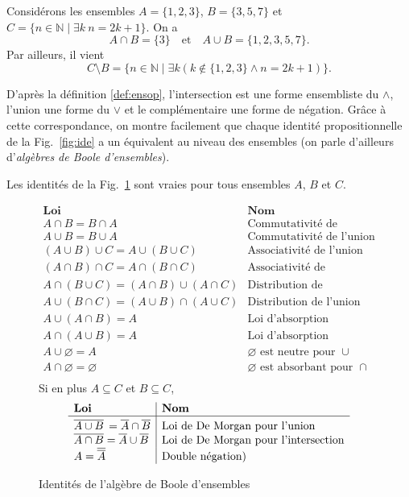 \documentclass[french,course,oneside,theoremnosection]{lecture}
\newcommand{\N}{\mathbb{N}}
\begin{document}
\begin{example}
Considérons les ensembles $A=\{1,2,3\}$, $B=\{3,5,7\}$ et $C=\{n \in \N \mid \exists k \ n=2k+1\}$.
On a 
\[
A\cap B=\{3\} \quad \text{et} \quad A \cup B=\{1,2,3,5,7\}.
\]
Par ailleurs, il vient
\[
C\setminus B = \{n \in \N \mid \exists k (k\not\in\{1, 2, 3\} \wedge n=2k+1)\}.
\]
\end{example}
D'après la définition \ref{def:ensop}, l'intersection est une forme ensembliste du $\wedge$, l'union une forme du $\vee$ et le complémentaire une forme de négation. Grâce à cette correspondance, on montre facilement que chaque identité propositionnelle de la Fig.~\ref{fig:ide} a un équivalent au niveau des ensembles (on parle d'ailleurs d'\emph{algèbres de Boole d'ensembles}).
\begin{proposition}
Les identités de la Fig.~\ref{fig:ens} sont vraies pour tous ensembles $A$, $B$ et $C$.
\end{proposition}
\begin{figure}
\[
\begin{array}{l|l}
\textbf{Loi} & \textbf{Nom} \\
\hline
A \cap B = B \cap A & \text{Commutativité de l'intersection} \\
A \cup B = B \cup A & \text{Commutativité de l'union} \\
(A \cup B) \cup C = A \cup (B \cup C) & \text{Associativité de l'union} \\
(A \cap B) \cap C = A \cap (B \cap C) & \text{Associativité de l'intersection} \\
A \cap (B \cup C) = (A \cap B) \cup (A \cap C) & \text{Distribution de l'intersection sur l'union} \\
A \cup (B \cap C) = (A \cup B) \cap (A \cup C) & \text{Distribution de l'union sur l'intersection} \\
A \cup (A \cap B) = A & \text{Loi d'absorption} \\
A \cap (A \cup B) = A & \text{Loi d'absorption} \\
A \cup \varnothing = A & \text{$\varnothing$ est neutre pour $\cup$}\\
A \cap \varnothing = \varnothing & \text{$\varnothing$ est absorbant pour $\cap$}\\
\end{array}
\]
Si en plus $A\subseteq C$ et $B\subseteq C$,
\[
\begin{array}{l|l}
\textbf{Loi} & \textbf{Nom} \\
\hline
\overline{A \cup B}^{\phantom{e^e}\hspace{-1.5ex}
} = \overline{A} \cap \overline{B} & \text{Loi de De Morgan pour l'union} \\
\overline{A \cap B} = \overline{A} \cup \overline{B} & \text{Loi de De Morgan pour l'intersection} \\
A = \overline{\overline{A}} & \text{Double négation)} \\
\end{array}
\]\caption{Identités de l'algèbre de Boole d'ensembles}\label{fig:ens}
\end{figure}
\end{document}
